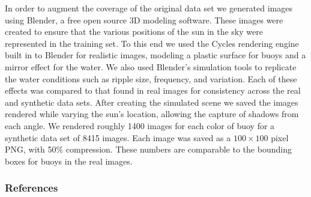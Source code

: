 \documentclass{article} %
\begin{document}
In order to augment the coverage of the original data set we generated images using Blender, a free open source 3D modeling software. These images were created to ensure that the various positions of the sun in the sky were represented in the training set. To this end we used the Cycles rendering engine built in to Blender for realistic images, modeling a plastic surface for buoys and a mirror effect for the water. We also used Blender's simulation tools to replicate the water conditions such as ripple size, frequency, and variation. Each of these effects was compared to that found in real images for consistency across the real and synthetic data sets. After creating the simulated scene we saved the images rendered while varying the sun's location, allowing the capture of shadows from each angle. We rendered roughly 1400 images for each color of buoy for a synthetic data set of 8415 images. Each image was saved as a $100 \times 100$ pixel PNG, with 50\% compression. These numbers are comparable to the bounding boxes for buoys in the real images.

\subsubsection*{References}


\end{document}
